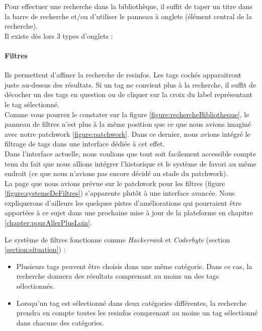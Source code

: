 \label{section:panneau}

Pour effectuer une recherche dans la bibliothèque, il suffit de taper un titre dans la barre de recherche et/ou d'utiliser le panneau à onglets (élément central de la recherche).\\

Il existe dès lors 3 types d'onglets :

\paragraph{Filtres} Ils permettent d'affiner la recherche de \glspl{resinfo}. Les \glspl{tag} cochés apparaitront juste au-dessus des résultats. Si un \gls{tag} ne convient plus à la recherche, il suffit de décocher un des tags en question ou de cliquer sur la croix du label représentant le \gls{tag} sélectionné.\\

Comme vous pourrez le constater sur la figure \ref{figure:rechercheBibliotheque}, le panneau de filtres n'est plus à la même position que ce que nous avions imaginé avec notre patchwork \ref{figure:patchwork}. Dans ce dernier, nous avions intégré le filtrage de \glspl{tag} dans une interface dédiée à cet effet.\\

Dans l'interface actuelle, nous voulions que tout soit facilement accessible compte tenu du fait que nous allions intégrer l'historique et le système de favori au même endroit (ce que nous n'avions pas encore décidé au stade du patchwork).\\

La page que nous avions prévue sur le patchwork pour les filtres (figure \ref{figure:systemeDeFiltres}) s'apparente plutôt à une interface avancée. Nous expliquerons d'ailleurs les quelques pistes d'améliorations qui pourraient être apportées à ce sujet dans une prochaine mise à jour de la plateforme en chapitre \ref{chapter:pourAllerPlusLoin}.

Le système de filtres fonctionne comme \textit{Hackerrank} et \textit{Coderbyte} (section \ref{section:situation}) :

\begin{itemize}
    \item Plusieurs \glspl{tag} peuvent être choisis dans une même catégorie. Dans ce cas, la recherche donnera des résultats comprenant au moins un des \glspl{tag} sélectionnés.
    \item Lorsqu'un \gls{tag} est sélectionné dans deux catégories différentes, la recherche prendra en compte toutes les \glspl{resinfo} comprenant au moins un \gls{tag} sélectionné dans chacune des catégories.
\end{itemize}

